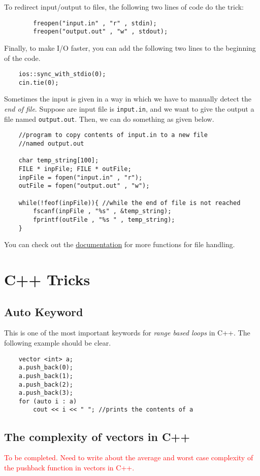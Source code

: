 \documentclass[12pt,a4paper]{amsart}
\numberwithin{equation}{section}
\theoremstyle{definition}
\begin{document}
To redirect input/output to files, the following two lines of code do the trick: 
    \begin{lstlisting}
        freopen("input.in" , "r" , stdin);
        freopen("output.out" , "w" , stdout);
    \end{lstlisting}
Finally, to make I/O faster, you can add the following two lines to the beginning of the code.

\begin{lstlisting}
    ios::sync_with_stdio(0);
    cin.tie(0);
\end{lstlisting}

\noindent Sometimes the input is given in a way in which we have to manually detect the \textit{end of file}. Suppose are input file is \verb|input.in|, and we want to give the output a file named \verb|output.out|. Then, we can do something as given below. 
\begin{lstlisting}
    //program to copy contents of input.in to a new file 
    //named output.out
    
    char temp_string[100];
    FILE * inpFile; FILE * outFile;
    inpFile = fopen("input.in" , "r");
    outFile = fopen("output.out" , "w");

    while(!feof(inpFile)){ //while the end of file is not reached
        fscanf(inpFile , "%s" , &temp_string);
        fprintf(outFile , "%s " , temp_string);
    }
\end{lstlisting}
You can check out the \href{http://www.cplusplus.com/reference/cstdio/fseek/}{documentation} for more functions for file handling. 
\section{C++ Tricks}

\subsection{Auto Keyword} This is one of the most important keywords for \textit{range based loops} in C++. The following example should be clear. 

\begin{lstlisting}
    vector <int> a;
    a.push_back(0);
    a.push_back(1);
    a.push_back(2);
    a.push_back(3);
    for (auto i : a)
        cout << i << " "; //prints the contents of a
\end{lstlisting}

\subsection{The complexity of vectors in C++} \textcolor{red}{To be completed. Need to write about the average and worst case complexity of the pushback function in vectors in C++.}
\end{document}
